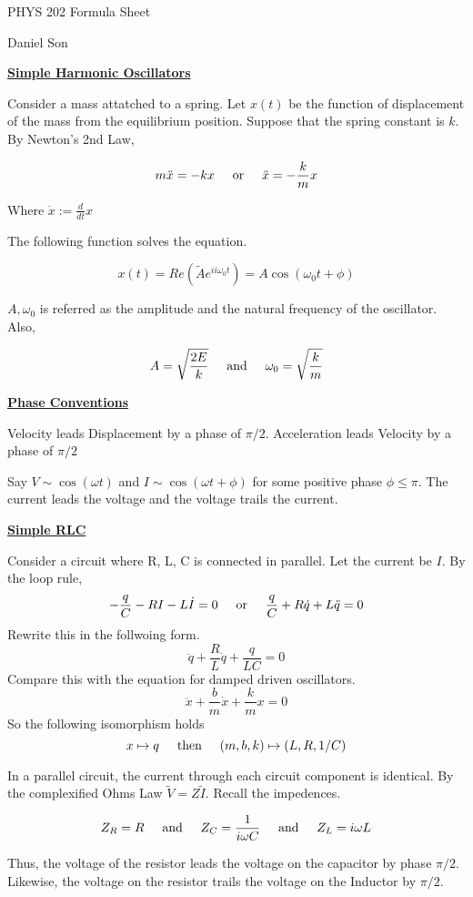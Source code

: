 \documentclass{article}
\newcommand{\new}[1]{
    \vspace{2mm}
    \noindent
    \textbf{
    \underline{#1}}
}
\newcommand{\textOr}{
    {
        \hspace{5mm}
        \textrm{or}
        \hspace{5mm}
    }
}
\newcommand{\textAnd}{
    {
        \hspace{5mm}
        \textrm{and}
        \hspace{5mm}
    }
}
\newcommand{\textThen}{
    {
        \hspace{5mm}
        \textrm{then}
        \hspace{5mm}
    }
}
\newcommand{\Ixp}[1]{
    {
        e^{i#1}
    }
}
\begin{document}
\begin{center}
\LARGE
PHYS 202 Formula Sheet

\Large
Daniel Son
\end{center}

\new{Simple Harmonic Oscillators}
Consider a mass attatched to a spring. Let 
$x(t)$ be the function of displacement of the mass 
from the equilibrium position. Suppose that the 
spring constant is $k$. By Newton's 2nd Law,

\[
    m\ddot{x} = -kx
    \textOr 
    \ddot{x} = -\frac k m x
\]

Where $\dot{x} := \frac{d}{dt}x$

The following function solves the equation. 

\[
    x(t) = Re(\tilde{A}\Ixp{i\omega_0 t})
    = A\cos(\omega_0 t + \phi)
\]

$A, \omega_0$ is referred as the amplitude and 
the natural frequency of the oscillator. Also, 

\[
    A = \sqrt\frac{2E}k 
    \textAnd
    \omega_0 = \sqrt\frac k m
\]

\new{Phase Conventions}
Velocity leads Displacement by a phase of $\pi/2$. 
Acceleration leads Velocity by a phase of $\pi/2$

Say $V \sim \cos(\omega t)$ and $I \sim \cos(\omega t + \phi)$
for some positive phase $\phi \leq \pi$. The current leads 
the voltage and the voltage trails the current. 

\new{Simple RLC}
Consider a circuit where R, L, C is connected in 
parallel. Let the current be $I$. By the loop rule, 
\[
    -\frac q C - R I - L \dot{I} = 0
    \textOr
    \frac q C + R \dot{q} + L \ddot{q} = 0 
\]
Rewrite this in the follwoing form. 
\[
    \ddot{q} + \frac R L \dot{q} + \frac q {LC} = 0
\]
Compare this with the equation for damped driven oscillators.  
\[
    \ddot{x} + \frac b m \dot{x} + \frac k m x = 0
\]
So the following isomorphism holds
\[
    x \mapsto q \textThen
    (m, b, k) \mapsto (L, R, 1/C)
\]

In a parallel circuit, the current through each 
circuit component is identical. By the complexified 
Ohms Law $\tilde V = Z \tilde I$. Recall the 
impedences. 

\[
    Z_R = R\textAnd Z_C = \frac{1}{i\omega C}\textAnd Z_L = i\omega L
\]

Thus, the voltage of the resistor leads the voltage on 
the capacitor by phase $\pi/2$. Likewise, the voltage 
on the resistor trails the voltage on the Inductor by $\pi/2$.
\end{document}
